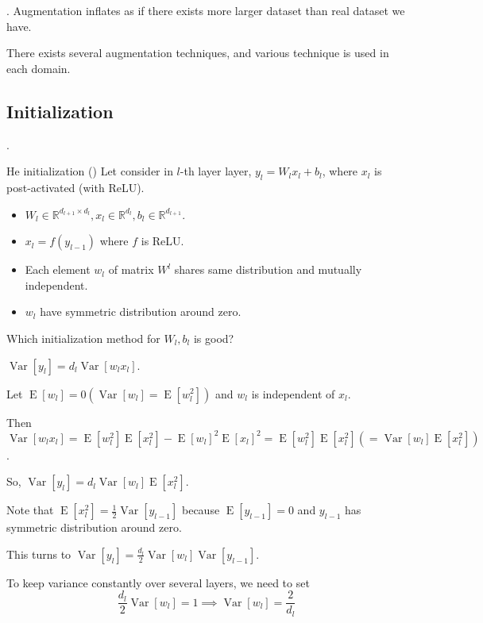 \documentclass[8pt]{beamer}
\newcommand{\mbb}[1]{\mathbb{#1}}
\newcommand{\expec}[1]{\operatorname{E}\left[ #1 \right]}
\newcommand{\Var}[1]{\operatorname{Var}\left[#1\right]}
\begin{document}
\begin{frame}{.}
    Augmentation inflates as if there exists more larger dataset than real dataset we have.

    There exists several augmentation techniques, and various technique is used in each domain.
\end{frame}

\subsection{Initialization}
\begin{frame}{.}
    \begin{block}{He initialization (\cite{he2015delving})}
        Let consider in $l$-th layer layer, $y_l = W_l x_{l} + b_l$, where $x_l$ is post-activated (with ReLU). 
        \begin{itemize}
            \item $W_l \in \mbb{R}^{d_{l+1} \times d_{l}}, x_l \in \mbb{R}^{d_{l}}, b_l \in \mbb{R}^{d_{l+1}}$.
            \item $x_l = f(y_{l-1})$ where $f$ is ReLU.
            \item Each element $w_l$ of matrix $W^l$ shares same distribution and mutually independent.
            \item $w_l$ have symmetric distribution around zero.
        \end{itemize}
        Which initialization method for $W_l, b_l$ is good?
    \end{block}


    $\Var{y_l} = d_l \Var{w_l x_l}$.

    Let $\expec{w_l} = 0 (\Var{w_l} = \expec{w_l^2})$ and $w_l$ is independent of $x_l$.

    Then $\Var{w_l x_l} = \expec{w_l^2} \expec{x_l^2} - \expec{w_l}^2 \expec{x_l}^2 = \expec{w^2_l} \expec{x^2_l}(=\Var{w_l}\expec{x^2_l})$.

    So, $\Var{y_l} = d_l \Var{w_l}\expec{x^2_l}$.

    Note that $\expec{x_l^2} = \frac{1}{2} \Var{y_{l-1}}$ because $\expec{y_{l-1}} = 0$ and $y_{l-1}$ has symmetric distribution around zero.

    This turns to $\Var{y_l} = \frac{d_l}{2} \Var{w_l} \Var{y_{l-1}}$.

    To keep variance constantly over several layers, we need to set 
    \[\frac{d_l}{2} \Var{w_l} = 1 \implies \Var{w_l} = \frac{2}{d_l}\]
\end{frame}
\end{document}
